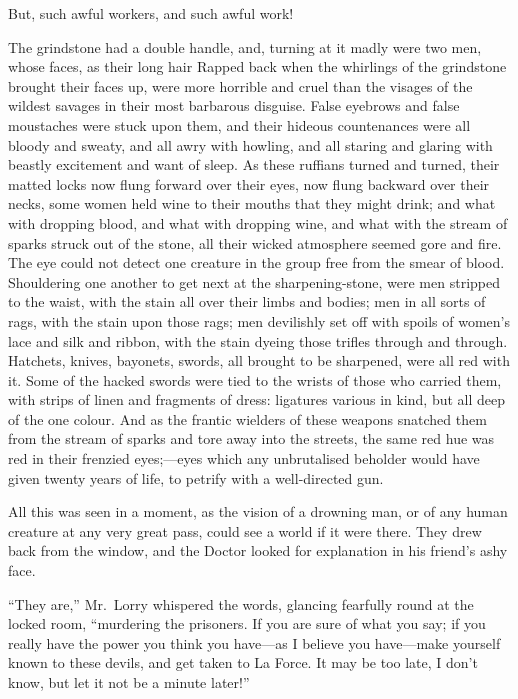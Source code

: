 But, such awful workers, and such awful work!

The grindstone had a double handle, and, turning at it madly were two
men, whose faces, as their long hair Rapped back when the whirlings
of the grindstone brought their faces up, were more horrible and
cruel than the visages of the wildest savages in their most barbarous
disguise. False eyebrows and false moustaches were stuck upon them,
and their hideous countenances were all bloody and sweaty, and all
awry with howling, and all staring and glaring with beastly
excitement and want of sleep.  As these ruffians turned and turned,
their matted locks now flung forward over their eyes, now flung
backward over their necks, some women held wine to their mouths that
they might drink; and what with dropping blood, and what with
dropping wine, and what with the stream of sparks struck out of the
stone, all their wicked atmosphere seemed gore and fire.  The eye
could not detect one creature in the group free from the smear of blood.
Shouldering one another to get next at the sharpening-stone, were men
stripped to the waist, with the stain all over their limbs and
bodies; men in all sorts of rags, with the stain upon those rags; men
devilishly set off with spoils of women's lace and silk and ribbon,
with the stain dyeing those trifles through and through.  Hatchets,
knives, bayonets, swords, all brought to be sharpened, were all red
with it. Some of the hacked swords were tied to the wrists of those
who carried them, with strips of linen and fragments of dress:
ligatures various in kind, but all deep of the one colour.  And as
the frantic wielders of these weapons snatched them from the stream
of sparks and tore away into the streets, the same red hue was red in
their frenzied eyes;---eyes which any unbrutalised beholder would have
given twenty years of life, to petrify with a well-directed gun.

All this was seen in a moment, as the vision of a drowning man, or of
any human creature at any very great pass, could see a world if it
were there.  They drew back from the window, and the Doctor looked
for explanation in his friend's ashy face.

``They are,'' Mr.\ Lorry whispered the words, glancing fearfully round
at the locked room, ``murdering the prisoners.  If you are sure of
what you say; if you really have the power you think you have---as I
believe you have---make yourself known to these devils, and get taken
to La Force.  It may be too late, I don't know, but let it not be a
minute later!''

